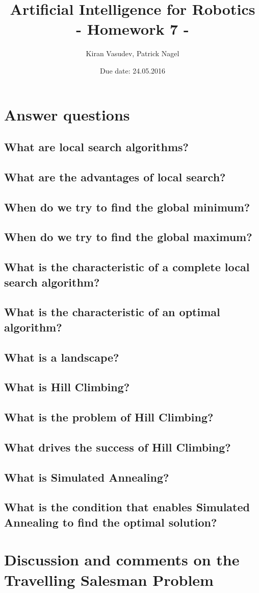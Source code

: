 \documentclass[11pt]{article}
\title{\textbf{Artificial Intelligence for Robotics\\ - Homework 7 -}}
\author{Kiran Vasudev, Patrick Nagel}
\date{Due date: 24.05.2016}
\begin{document}
\maketitle

\newpage
\tableofcontents

\newpage
\section{Answer questions}
\subsection{What are local search algorithms?}
\subsection{What are the advantages of local search?}
\subsection{When do we try to find the global minimum?}
\subsection{When do we try to find the global maximum?}
\subsection{What is the characteristic of a complete local search algorithm?}
\subsection{What is the characteristic of an optimal algorithm?}
\subsection{What is a landscape?}
\subsection{What is Hill Climbing?}
\subsection{What is the problem of Hill Climbing?}
\subsection{What drives the success of Hill Climbing?}
\subsection{What is Simulated Annealing?}
\subsection{What is the condition that enables Simulated Annealing to find
the optimal solution?}

\newpage
\section{Discussion and comments on the Travelling Salesman Problem}
\end{document}
